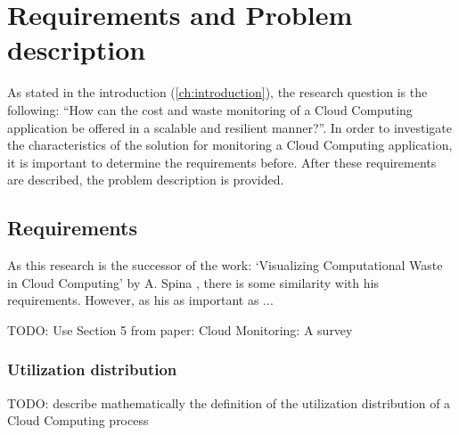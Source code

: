 \chapter{Requirements and Problem description}\label{ch:requirements} %
As stated in the introduction (\autoref{ch:introduction}), the research question is the following: ``How can the cost and waste monitoring of a Cloud Computing application be offered in a scalable and resilient manner?''. In order to investigate the characteristics of the solution for monitoring a Cloud Computing application, it is important to determine the requirements before. After these requirements are described, the problem description is provided. 

\section{Requirements} \label{sec:requirements}
As this research is the successor of the work: `Visualizing Computational Waste in Cloud Computing' by A. Spina \cite{spina}, there is some similarity with his requirements. However, as his as important as ...

TODO: Use Section 5 from paper: Cloud Monitoring: A survey


\subsection{Utilization distribution} \label{sec:utilization}
TODO: describe mathematically the definition of the utilization distribution of a Cloud Computing process 